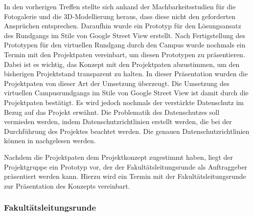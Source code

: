 In den vorherigen Treffen stellte sich anhand der Machbarkeitsstudien für die
Fotogalerie und die 3D-Modellierung heraus, dass diese nicht den geforderten
Ansprüchen entsprechen. Daraufhin wurde ein Prototyp für den Lösungsansatz des
Rundgangs im Stile von Google Street View erstellt. Nach Fertigstellung des
Prototypen für den virtuellen Rundgang durch den Campus wurde nochmals ein
Termin mit den Projektpaten vereinbart, um diesen Prototypen zu präsentieren.
Dabei ist es wichtig, das Konzept mit den Projektpaten abzustimmen, um den bisherigen Projektstand transparent zu halten. In dieser Präsentation wurden die Projektpaten von dieser Art der Umsetzung überzeugt. Die Umsetzung des
virtuellen Campusrundgangs im Stile von Google Street View ist damit durch die Projektpaten bestätigt. Es wird jedoch nochmals der verstärkte Datenschutz im Bezug auf das Projekt 
erwähnt. Die Problematik des Datenschutzes soll vermieden werden, indem Datenschutzrichtlinien erstellt werden, die bei 
der Durchführung des Projektes beachtet werden. Die genauen
Datenschutzrichtlinien können in  nachgelesen
werden.

Nachdem die Projektpaten dem Projektkonzept zugestimmt haben, liegt der Projektgruppe ein Prototyp vor, der der 
Fakultätsleitungsrunde als Auftraggeber präsentiert werden kann.
Hierzu wird ein Termin mit der Fakultätsleitungsrunde zur Präsentation des Konzepts vereinbart.


\subsubsection*{Fakultätsleitungsrunde}
\label{sec:Treffen4}

